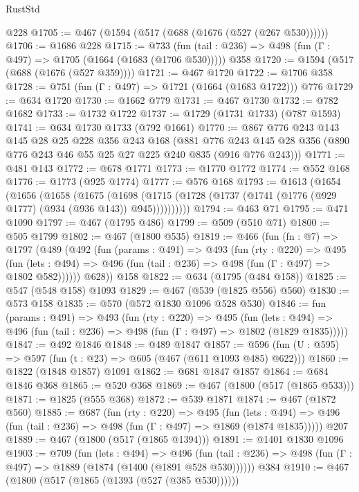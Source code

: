 \begin{lexlean}{RustStd}
\begin{coremodule}
    @228
@1705 := @467 (@1594 (@517 (@688 (@1676 (@527 (@267 @530))))))
@1706 := @1686 @228
@1715 := @733
    (fun (tail : @236) => @498 (fun (Γ : @497) => @1705 (@1664 (@1683 (@1706 @530)))))
    @358
@1720 := @1594 (@517 (@688 (@1676 (@527 @359))))
@1721 := @467 @1720
@1722 := @1706 @358
@1728 := @751 (fun (Γ : @497) => @1721 (@1664 (@1683 @1722))) @776
@1729 := @634 @1720
@1730 := @1662 @779
@1731 := @467 @1730
@1732 := @782 @1682
@1733 := @1732 @1722
@1737 := @1729 (@1731 @1733) (@787 @1593)
@1741 := @634 @1730 @1733 (@792 @1661)
@1770 := @867
    @776
    @243
    @143
    @145
    @28
    @25
    @228
    @356
    @243
    @168
    (@881 @776 @243 @145 @28 @356 (@890 @776 @243 @46 @55 @25 @27 @225 @240 @835 (@916 @776 @243)))
@1771 := @481 @143
@1772 := @678 @1771
@1773 := @1770 @1772
@1774 := @552 @168
@1776 := @1773 (@925 @1774)
@1777 := @576 @168
@1793 := @1613
    (@1654
      (@1656
        (@1658
          (@1675
            (@1698 (@1715 (@1728 (@1737 (@1741 (@1776 (@929 @1777) (@934 (@936 @143)) @945))))))))))
@1794 := @463 @71
@1795 := @471 @1090
@1797 := @467 (@1795 @486)
@1799 := @509 (@510 @71)
@1800 := @505 @1799
@1802 := @467 (@1800 @535)
@1819 := @466
    (fun (fn : @7) =>
    @1797
      (@489
        (@492
          (fun (params : @491) =>
          @493
            (fun (rty : @220) =>
            @495
              (fun (lets : @494) =>
              @496 (fun (tail : @236) => @498 (fun (Γ : @497) => @1802 @582))))))
        @628))
    @158
@1822 := @634 (@1795 (@484 @158))
@1825 := @547 (@548 @158) @1093
@1829 := @467 (@539 (@1825 @556) @560)
@1830 := @573 @158
@1835 := @570 (@572 @1830 @1096 @528 @530)
@1846 := fun (params : @491) =>
  @493
    (fun (rty : @220) =>
    @495
      (fun (lets : @494) =>
      @496 (fun (tail : @236) => @498 (fun (Γ : @497) => @1802 (@1829 @1835)))))
@1847 := @492 @1846
@1848 := @489 @1847
@1857 := @596 (fun (U : @595) => @597 (fun (t : @23) => @605 (@467 (@611 @1093 @485) @622)))
@1860 := @1822 (@1848 @1857) @1091
@1862 := @681 @1847 @1857
@1864 := @684 @1846 @368
@1865 := @520 @368
@1869 := @467 (@1800 (@517 (@1865 @533)))
@1871 := @1825 (@555 @368)
@1872 := @539 @1871
@1874 := @467 (@1872 @560)
@1885 := @687
    (fun (rty : @220) =>
    @495
      (fun (lets : @494) =>
      @496 (fun (tail : @236) => @498 (fun (Γ : @497) => @1869 (@1874 @1835)))))
    @207
@1889 := @467 (@1800 (@517 (@1865 @1394)))
@1891 := @1401 @1830 @1096
@1903 := @709
    (fun (lets : @494) =>
    @496 (fun (tail : @236) => @498 (fun (Γ : @497) => @1889 (@1874 (@1400 (@1891 @528 @530))))))
    @384
@1910 := @467 (@1800 (@517 (@1865 (@1393 (@527 (@385 @530))))))

\end{coremodule}
\end{lexlean}
